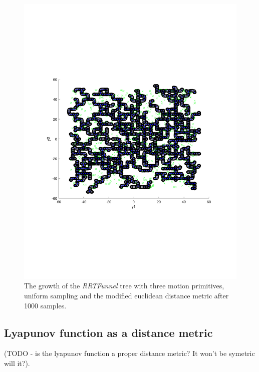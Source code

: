 \begin{figure}
  \includegraphics[scale=.5]{figures/rrtfunnel/rrtfunnel-modified-euclidean-1000samples}
  \caption{The growth of the \textit{RRTFunnel} tree with three motion
    primitives, uniform sampling and the modified euclidean distance metric
    after 1000 samples.}
\end{figure}


\subsection{Lyapunov function as a distance metric}
(TODO - is the lyapunov function a proper distance metric? It won't be symetric
will it?).

